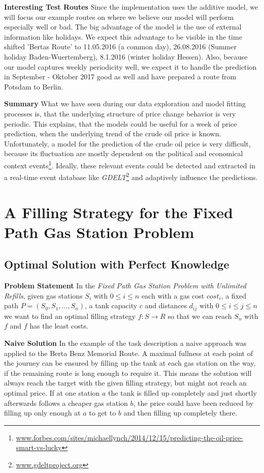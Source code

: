 \documentclass[%
a4paper,
DIV12,
2.5headlines,
bigheadings,
titlepage,
openbib,
]{scrartcl}
\begin{document}
\textbf{Interesting Test Routes} Since the implementation uses the additive model, we will focus our example routes on where we believe our model will perform especially well or bad.
The big advantage of the model is the use of external information like holidays.
We expect this advantage to be visible in the time shifted 'Bertas Route' to 11.05.2016 (a common day), 26.08.2016 (Summer holiday Baden-Wuertemberg), 8.1.2016 (winter holiday Hessen). 
Also, because our model captures weekly periodicity well, we expect it to handle the prediction in September - Oktober 2017 good as well and have prepared a route from Potsdam to Berlin.

\textbf{Summary}
What we have seen during our data exploration and model fitting processes is, that the underlying structure of price change behavior is very periodic.
This explains, that the models could be useful for a week of price prediction, when the underlying trend of the crude oil price is known.
Unfortunately, a model for the prediction of the crude oil price is very difficult, because its fluctuation are mostly dependent on the political and economical context events\footnote{\url{www.forbes.com/sites/michaellynch/2014/12/15/predicting-the-oil-price-smart-vs-lucky}}.
Ideally, these relevant events could be detected and extracted in a real-time event database like \textit{GDELT}\footnote{\url{www.gdeltproject.org}} and adaptively influence the predictions.

\section{A Filling Strategy for the Fixed Path Gas Station Problem}
\label{fixed_path_gas_station_problem}

\subsection{Optimal Solution with Perfect Knowledge}
\textbf{Problem Statement} In the \textit{Fixed Path Gas Station Problem with Unlimited Refills}, given gas stations $S_i$ with $0 \leq i \leq n$ each with a gas cost $cost_i$, a fixed path $P = (S_0,S_1, ..., S_n)$, a tank capacity $c$ and distances $d_{ij}$ with $0 \leq i \leq j \leq n$ we want to find an optimal filling strategy $f: S \rightarrow R$ so that we can reach $S_n$ with $f$ and $f$ has the least costs.

\textbf{Naive Solution}
In the example of the task description a naive approach was applied to the Berta Benz Memorial Route.
A maximal fullness at each point of the journey can be ensured by filling up the tank at each gas station on the way, if the remaining route is long enough to require it.
This means the solution will always reach the target with the given filling strategy, but might not reach an optimal price.
If at one station $a$ the tank is filled up completely and just shortly afterwards follows a cheaper gas station $b$, the price could have been reduced by filling up only enough at $a$ to get to $b$ and then filling up completely there.
\end{document}
